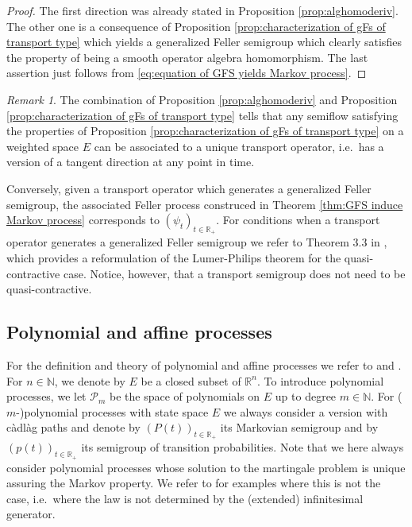 \documentclass[a4paper,12pt]{article}
\theoremstyle{definition}
\theoremstyle{remark}
\newtheorem{remark}[theorem]{Remark}
\numberwithin{equation}{section}
\numberwithin{theorem}{section}
\begin{document}
\begin{proof}
The first direction was already stated in Proposition \ref{prop:alghomoderiv}. The other one is a consequence of Proposition \ref{prop:characterization of gFs of transport type} which yields a generalized Feller semigroup which clearly satisfies the property of being a smooth operator algebra homomorphism. The last assertion just follows from \eqref{eq:equation of GFS yields Markov process}.
\end{proof}

\begin{remark}
The combination of Proposition \ref{prop:alghomoderiv} and Proposition \ref{prop:characterization of gFs of transport type} tells that any semiflow satisfying the properties of Proposition \ref{prop:characterization of gFs of transport type} on a weighted space $E$ can be associated to a unique transport operator, i.e.~has a version of a tangent direction at any point in time.

Conversely, given a transport operator which generates a generalized Feller semigroup, the associated Feller process construced in Theorem \ref{thm:GFS induce Markov process} corresponds to $(\psi_t)_{t \in \mathbb{R}_+}$. For conditions when a transport operator generates a generalized Feller semigroup we refer to Theorem 3.3 in \cite{DoT}, which provides a reformulation of the Lumer-Philips theorem for the quasi-contractive case. Notice, however, that a transport semigroup does not need to be quasi-contractive.
\end{remark}

\subsection{Polynomial and affine processes}\label{sec:affineandpoly}

For the definition and theory of  polynomial and affine processes we refer to  \cite{CMT, filipovic2016polynomial} and \cite{DFS:03}.
For $n\in \mathbb{N}$,  we denote by $E$ be a closed subset of  $\mathbb{R}^n$.
To introduce polynomial processes, we let $\mathcal{P}_{m}$ be the space of polynomials on $E$ up to degree $m \in \mathbb{N}$. For ($m$-)polynomial processes with state space $E$ we always consider a version with càdlàg paths and denote by $\left(P(t)\right)_{t\in{\mathbb{R}_+}}$ its Markovian semigroup and by $\left(p(t)\right)_{t\in{\mathbb{R}_+}}$ its semigroup of transition probabilities. Note that we here always consider polynomial processes whose solution to the martingale problem is unique assuring the Markov property. We refer to \cite{KK:20} 
for examples where this is not the case, i.e.~where the law is not determined by the (extended) infinitesimal generator.
\end{document}
